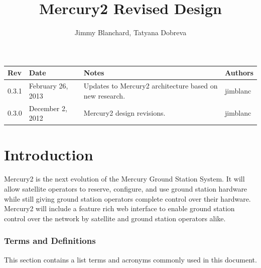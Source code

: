 \documentclass{mxl-design}
\title{Mercury2 Revised Design}
\author{Jimmy Blanchard, Tatyana Dobreva}
\begin{document}
\maketitle

\vspace{5in}
\begin{table}[H]
\begin{center}
\begin{tabular}{|p{0.5in}|p{1.2in}|p{2.8in}|p{0.5in}|}
	\hline
	\bf Rev & \bf Date & \bf Notes & \bf Authors \\ 
	\hline
	0.3.1 & February 26, 2013 & Updates to Mercury2 architecture based on new research. & jimblanc \\ \hline
	0.3.0 & December 2, 2012 & Mercury2 design revisions. & jimblanc \\ \hline
\end{tabular}
\end{center}
\end{table}

\clearpage
\tableofcontents
\clearpage

\part{Introduction}
Mercury2 is the next evolution of the Mercury Ground Station System. It will allow satellite operators to reserve, configure, and use ground station hardware while still giving ground station operators complete control over their hardware. Mercury2 will include a feature rich web interface to enable ground station control over the network by satellite and ground station operators alike.

\section{Terms and Definitions}
\label{sec:terms}
This section contains a list terms and acronyms commonly used in this document.
\end{document}
